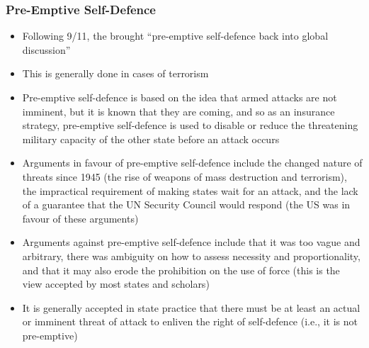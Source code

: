 \subsubsection{Pre-Emptive Self-Defence}
\begin{itemize}
    \item Following 9/11, the  brought  ``pre-emptive self-defence back into global discussion''
    \item This is generally done in cases of terrorism
    \item Pre-emptive self-defence is based on the idea that armed attacks are not imminent, but it is known that they are coming, and so as an insurance strategy, pre-emptive self-defence is used to disable or reduce the threatening military capacity of the other state before an attack occurs
    \item Arguments in favour of pre-emptive self-defence include the changed nature of threats since 1945 (the rise of weapons of mass destruction and terrorism), the impractical requirement of making states wait for an attack, and the lack of a guarantee that the UN Security Council would respond (the US was in favour of these arguments)
    \item Arguments against pre-emptive self-defence include that it was too vague and arbitrary, there was ambiguity on how to assess necessity and proportionality, and that it may also erode the prohibition on the use of force (this is the view accepted by most states and scholars)
    \item It is generally accepted in state practice that there must be at least an actual or imminent threat of attack to enliven the right of self-defence (i.e., it is not pre-emptive)
\end{itemize}


